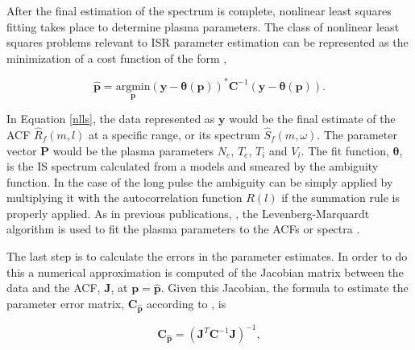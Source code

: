 \documentclass[draft,ras]{agutex}
\newcommand{\pcom}[2]{\marginpar{{\footnotesize \bf #1}}{\it {#2}}}
\begin{document}
\begin{article}

After the final estimation of the spectrum is complete, nonlinear least squares fitting takes place to determine plasma parameters.  
The class of nonlinear least squares problems relevant to ISR parameter estimation can be represented as the minimization of a cost function of the form \citep{kayvol1},

\begin{equation}
	\mathbf{\hat{p}}= \underset{\mathbf{p}}{\text{argmin}} (\mathbf{y}-\bm{\theta}(\mathbf{p}))^*\mathbf{C}^{-1}(\mathbf{y}-\bm{\theta}(\mathbf{p})).
\label{nlls}
\end{equation}

In Equation \ref{nlls}, the data represented as $\mathbf{y}$ would be the final estimate of the ACF $\widehat{R}_f(m,l)$ at a specific range, or its spectrum $\widehat{S}_f(m,\omega)$. The parameter vector $\mathbf{P}$ would be the plasma parameters $N_e$, $T_e$, $T_i$ and $V_i$. The fit function, $\bm{\theta}$, is the IS spectrum calculated from a models \citep[e.g.,][]{kudeki:milla:1} and smeared by the ambiguity function. In the case of the long pulse the ambiguity can be simply applied by multiplying it with the autocorrelation function $R(l)$ if the summation rule is properly applied. As in previous publications, \citep[e.g.,][]{nikoukar2008}, the Levenberg-Marquardt algorithm is used to fit the plasma parameters to the ACFs or spectra \citep{levenberg1944,marquardt:1963}.

The last step is to calculate the errors in the parameter estimates. In order to do this a numerical approximation is computed of the Jacobian matrix between the data and the ACF, $\mathbf{J}$, at $\mathbf{p}=\mathbf{\hat{p}}$. Given this Jacobian, the formula to estimate the parameter error matrix, $\mathbf{C}_{\mathbf{\hat{p}}}$ according to \citet{Hysell:2000cq}, is


\begin{equation}
\label{eqn:jacinv}
\mathbf{C}_{\mathbf{\hat{p}}}=(\mathbf{J}^T \mathbf{C}^{-1}\mathbf{J})^{-1},
\end{equation}


\end{article}
\end{document}
